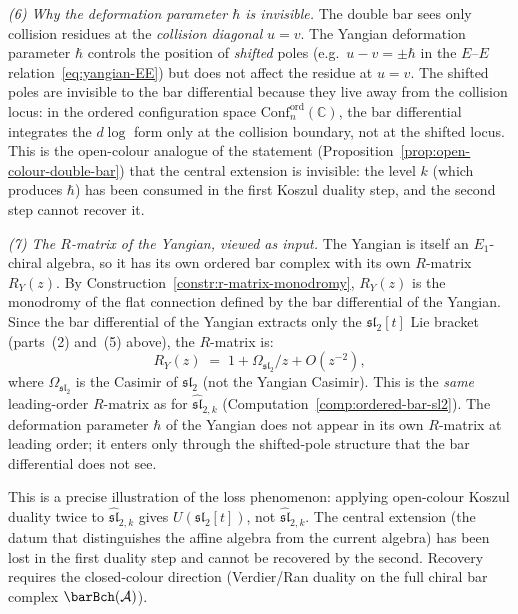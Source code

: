\begin{computation}
\medskip
\noindent\emph{(6) Why the deformation parameter
$\hbar$ is invisible.}
The double bar sees only collision residues at the
\emph{collision diagonal} $u = v$. The Yangian
deformation parameter $\hbar$ controls the position
of \emph{shifted} poles (e.g.\ $u{-}v = \pm\hbar$
in the $E$--$E$ relation~\eqref{eq:yangian-EE}) but
does not affect the residue at $u = v$. The shifted
poles are invisible to the bar differential because
they live away from the collision locus: in the
ordered configuration space
$\mathrm{Conf}_n^{\mathrm{ord}}(\mathbb{C})$, the
bar differential integrates the $d\!\log$ form only
at the collision boundary, not at the shifted locus.
This is the open-colour analogue of the statement
(Proposition~\ref{prop:open-colour-double-bar}) that
the central extension is invisible: the level
$k$ (which produces $\hbar$) has been consumed in the
first Koszul duality step, and the second step cannot
recover it.

\medskip
\noindent\emph{(7) The $R$-matrix of the Yangian,
viewed as input.}
The Yangian is itself an $E_1$-chiral algebra, so
it has its own ordered bar complex with its own
$R$-matrix $R_Y(z)$. By
Construction~\ref{constr:r-matrix-monodromy},
$R_Y(z)$ is the monodromy of the flat connection
defined by the bar differential of the Yangian.
Since the bar differential of the Yangian extracts
only the $\mathfrak{sl}_2[t]$ Lie bracket (parts~(2)
and~(5) above), the $R$-matrix is:
\begin{equation}\label{eq:yangian-r-matrix-own}
R_Y(z)
\;=\;
1 + \Omega_{\mathfrak{sl}_2}/z + O(z^{-2}),
\end{equation}
where $\Omega_{\mathfrak{sl}_2}$ is the Casimir of
$\mathfrak{sl}_2$ (not the Yangian Casimir). This
is the \emph{same} leading-order $R$-matrix as for
$\widehat{\mathfrak{sl}}_{2,k}$
(Computation~\ref{comp:ordered-bar-sl2}). The
deformation parameter $\hbar$ of the Yangian does
not appear in its own $R$-matrix at leading order;
it enters only through the shifted-pole structure
that the bar differential does not see.

This is a precise illustration of the loss phenomenon:
applying open-colour Koszul duality twice to
$\widehat{\mathfrak{sl}}_{2,k}$ gives
$U(\mathfrak{sl}_2[t])$, not
$\widehat{\mathfrak{sl}}_{2,k}$. The central
extension (the datum that distinguishes the affine
algebra from the current algebra) has been lost in
the first duality step and cannot be recovered by
the second. Recovery requires the closed-colour
direction (Verdier/Ran duality on the full
chiral bar complex $\barBch(\cA)$).
\end{computation}

